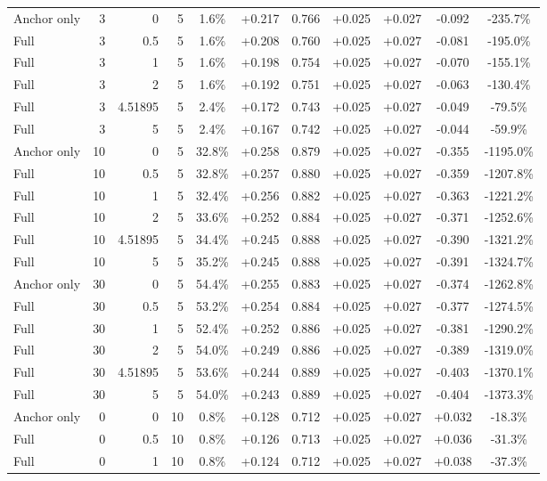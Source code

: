 \begin{table}[htbp]
\begin{tabular}{lrrrccccccc}
Anchor only & 3 & 0 & 5 & 1.6\% & +0.217 & 0.766 & +0.025 & +0.027 & -0.092 & -235.7\% \\
Full & 3 & 0.5 & 5 & 1.6\% & +0.208 & 0.760 & +0.025 & +0.027 & -0.081 & -195.0\% \\
Full & 3 & 1 & 5 & 1.6\% & +0.198 & 0.754 & +0.025 & +0.027 & -0.070 & -155.1\% \\
Full & 3 & 2 & 5 & 1.6\% & +0.192 & 0.751 & +0.025 & +0.027 & -0.063 & -130.4\% \\
Full & 3 & 4.51895 & 5 & 2.4\% & +0.172 & 0.743 & +0.025 & +0.027 & -0.049 & -79.5\% \\
Full & 3 & 5 & 5 & 2.4\% & +0.167 & 0.742 & +0.025 & +0.027 & -0.044 & -59.9\% \\
Anchor only & 10 & 0 & 5 & 32.8\% & +0.258 & 0.879 & +0.025 & +0.027 & -0.355 & -1195.0\% \\
Full & 10 & 0.5 & 5 & 32.8\% & +0.257 & 0.880 & +0.025 & +0.027 & -0.359 & -1207.8\% \\
Full & 10 & 1 & 5 & 32.4\% & +0.256 & 0.882 & +0.025 & +0.027 & -0.363 & -1221.2\% \\
Full & 10 & 2 & 5 & 33.6\% & +0.252 & 0.884 & +0.025 & +0.027 & -0.371 & -1252.6\% \\
Full & 10 & 4.51895 & 5 & 34.4\% & +0.245 & 0.888 & +0.025 & +0.027 & -0.390 & -1321.2\% \\
Full & 10 & 5 & 5 & 35.2\% & +0.245 & 0.888 & +0.025 & +0.027 & -0.391 & -1324.7\% \\
Anchor only & 30 & 0 & 5 & 54.4\% & +0.255 & 0.883 & +0.025 & +0.027 & -0.374 & -1262.8\% \\
Full & 30 & 0.5 & 5 & 53.2\% & +0.254 & 0.884 & +0.025 & +0.027 & -0.377 & -1274.5\% \\
Full & 30 & 1 & 5 & 52.4\% & +0.252 & 0.886 & +0.025 & +0.027 & -0.381 & -1290.2\% \\
Full & 30 & 2 & 5 & 54.0\% & +0.249 & 0.886 & +0.025 & +0.027 & -0.389 & -1319.0\% \\
Full & 30 & 4.51895 & 5 & 53.6\% & +0.244 & 0.889 & +0.025 & +0.027 & -0.403 & -1370.1\% \\
Full & 30 & 5 & 5 & 54.0\% & +0.243 & 0.889 & +0.025 & +0.027 & -0.404 & -1373.3\% \\
Anchor only & 0 & 0 & 10 & 0.8\% & +0.128 & 0.712 & +0.025 & +0.027 & +0.032 & -18.3\% \\
Full & 0 & 0.5 & 10 & 0.8\% & +0.126 & 0.713 & +0.025 & +0.027 & +0.036 & -31.3\% \\
Full & 0 & 1 & 10 & 0.8\% & +0.124 & 0.712 & +0.025 & +0.027 & +0.038 & -37.3\% \\

\end{tabular}
\end{table}
